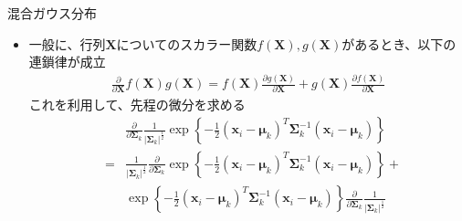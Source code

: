 \documentclass[dvipdfmx,notheorems,t]{beamer}
\begin{document}
\begin{frame}{混合ガウス分布}
\begin{itemize}
\begin{itemize}
		\item 一般に、行列$\bm{X}$についてのスカラー関数$f(\bm{X}), g(\bm{X})$があるとき、以下の\alert{連鎖律}が成立
		\begin{eqnarray}
			\frac{\partial}{\partial \bm{X}} f(\bm{X}) g(\bm{X}) = f(\bm{X}) \frac{\partial g(\bm{X})}{\partial \bm{X}} + g(\bm{X}) \frac{\partial f(\bm{X})}{\partial \bm{X}}
		\end{eqnarray}
		これを利用して、先程の微分を求める
		\begin{eqnarray}
			&& \frac{\partial}{\partial \bm{\Sigma}_k} \frac{1}{|\bm{\Sigma}_k|^\frac{1}{2}} \exp \left\{ - \frac{1}{2} (\bm{x}_i - \bm{\mu}_k)^T \bm{\Sigma}_k^{-1} (\bm{x}_i - \bm{\mu}_k) \right\} \nonumber \\
			&=& \frac{1}{|\bm{\Sigma}_k|^\frac{1}{2}} \frac{\partial}{\partial \bm{\Sigma}_k} \exp \left\{ - \frac{1}{2} (\bm{x}_i - \bm{\mu}_k)^T \bm{\Sigma}_k^{-1} (\bm{x}_i - \bm{\mu}_k) \right\} + \nonumber \\
			&& \exp \left\{ - \frac{1}{2} (\bm{x}_i - \bm{\mu}_k)^T \bm{\Sigma}_k^{-1} (\bm{x}_i - \bm{\mu}_k) \right\} \frac{\partial}{\partial \bm{\Sigma}_k} \frac{1}{|\bm{\Sigma}_k|^\frac{1}{2}}
		\end{eqnarray}
		\newline
		

\end{itemize}
\end{itemize}
\end{frame}
\end{document}
